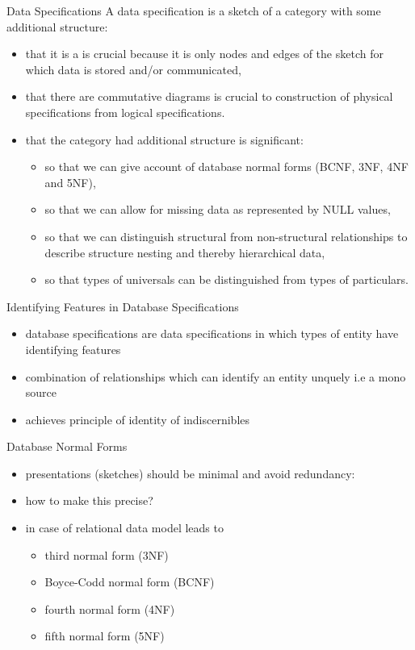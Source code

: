 \begin{frame}{Data Specifications}
A data specification is a sketch of a category with some additional structure:
\begin{itemize}
\item that it is a  is crucial because it is only nodes and edges of the sketch for which data is stored and/or communicated, 
\item that there are commutative diagrams is crucial to construction of physical 
specifications from logical specifications.
\item that the category had additional structure is significant:
\begin{itemize}
\item so that we can give account of database normal forms 
(BCNF, 3NF, 4NF and 5NF),
\item so that we can allow for missing data as represented by NULL values, 
\item so that we can distinguish structural from non-structural relationships to describe structure nesting and thereby hierarchical data,
\item so that types of universals can be distinguished from types of particulars.
\end{itemize}
\end{itemize}
\end{frame}



\begin{frame}{Identifying Features in Database Specifications}
\begin{itemize}
\item database specifications are data specifications in which types of entity have 
identifying features
\item combination of relationships which can identify an entity unquely
i.e a mono source
\item achieves principle of identity of indiscernibles
\end {itemize}
\end{frame}

\begin{frame}{Database Normal Forms}
\begin{itemize}
\item presentations (sketches) should be minimal and avoid redundancy:
\item how to make this precise?
\item in case of relational data model leads to 
   \begin{itemize}
     \item third normal form (3NF)
     \item Boyce-Codd normal form (BCNF)
     \item fourth normal form (4NF)
     \item fifth normal form (5NF)
   \end{itemize}
\end{itemize}
\end{frame}

